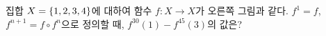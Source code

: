 \noindent\begin{minipage}[t]{0.58\linewidth}\vspace{0pt}\raggedright 집합 $X=\{1{,}\mkern3mu\mathopen{}2{,}\mkern3mu\mathopen{}3{,}\mkern3mu\mathopen{}4\}$에 대하여 함수 $f:X\longrightarrow X$가 오른쪽 그림과 같다. $f^1=f$, $f^{n+1}=f\circ f^n$으로 정의할 때, $f^{30}(1)-f^{45}(3)$의 값은?\end{minipage}\hfill\begin{minipage}[t]{0.4\linewidth}\vspace{0pt}\centering \resizebox{\ifdim\width>\linewidth\linewidth\else\width\fi}{!}{}\end{minipage}\par
{}
